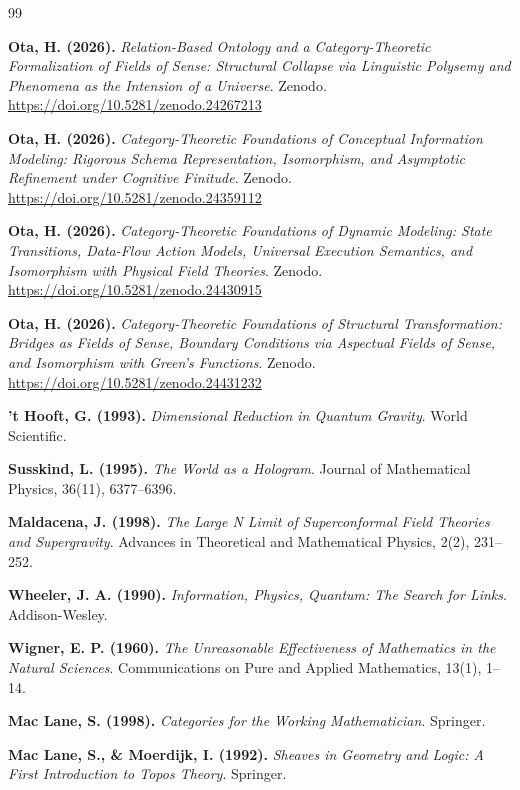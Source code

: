 \documentclass[11pt,a4paper]{ltjsarticle}
\theoremstyle{definition}
\theoremstyle{plain}
\begin{document}
\begin{thebibliography}{99}

\textbf{Ota, H. (2026).} \textit{Relation-Based Ontology and a Category-Theoretic Formalization of Fields of Sense: Structural Collapse via Linguistic Polysemy and Phenomena as the Intension of a Universe}. Zenodo. \url{https://doi.org/10.5281/zenodo.24267213}

\textbf{Ota, H. (2026).} \textit{Category-Theoretic Foundations of Conceptual Information Modeling: Rigorous Schema Representation, Isomorphism, and Asymptotic Refinement under Cognitive Finitude}. Zenodo. \url{https://doi.org/10.5281/zenodo.24359112}

\textbf{Ota, H. (2026).} \textit{Category-Theoretic Foundations of Dynamic Modeling: State Transitions, Data-Flow Action Models, Universal Execution Semantics, and Isomorphism with Physical Field Theories}. Zenodo. \url{https://doi.org/10.5281/zenodo.24430915}

\textbf{Ota, H. (2026).} \textit{Category-Theoretic Foundations of Structural Transformation: Bridges as Fields of Sense, Boundary Conditions via Aspectual Fields of Sense, and Isomorphism with Green's Functions}. Zenodo. \url{https://doi.org/10.5281/zenodo.24431232}

\textbf{'t Hooft, G. (1993).} \textit{Dimensional Reduction in Quantum Gravity}. World Scientific.

\textbf{Susskind, L. (1995).} \textit{The World as a Hologram}. Journal of Mathematical Physics, 36(11), 6377--6396.

\textbf{Maldacena, J. (1998).} \textit{The Large N Limit of Superconformal Field Theories and Supergravity}. Advances in Theoretical and Mathematical Physics, 2(2), 231--252.

\textbf{Wheeler, J. A. (1990).} \textit{Information, Physics, Quantum: The Search for Links}. Addison-Wesley.

\textbf{Wigner, E. P. (1960).} \textit{The Unreasonable Effectiveness of Mathematics in the Natural Sciences}. Communications on Pure and Applied Mathematics, 13(1), 1--14.

\textbf{Mac Lane, S. (1998).} \textit{Categories for the Working Mathematician}. Springer.

\textbf{Mac Lane, S., \& Moerdijk, I. (1992).} \textit{Sheaves in Geometry and Logic: A First Introduction to Topos Theory}. Springer.


\end{thebibliography}
\end{document}
